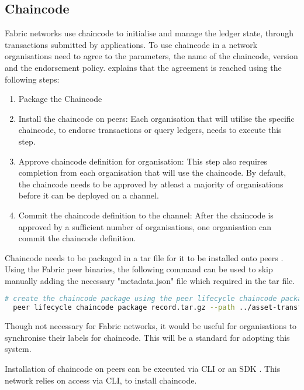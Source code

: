 \subsection{Chaincode}
Fabric networks use chaincode to initialise and manage the ledger state, through transactions submitted by applications. \cite{noauthor_writing_nodate}
To use chaincode in a network organisations need to agree to the parameters, the name of the chaincode, version and the endorsement policy. 
\cite{noauthor_writing_nodate} explains that the agreement is reached using the following steps:
\begin{enumerate}
  \item Package the Chaincode
  \item Install the chaincode on peers: Each organisation that will utilise the specific chaincode, to endorse transactions or query ledgers, needs to execute this step.
  \item Approve chaincode definition for organisation: This step also requires completion from each organisation that will use the chaincode. By default, the chaincode needs to be approved by atleast a majority of organisations before it can be deployed on a channel.
  \item Commit the chaincode definition to the channel: After the chaincode is approved by a sufficient number of organisations, one organisation can commit the chaincode definition.
\end{enumerate}

Chaincode needs to be packaged in a tar file for it to be installed onto peers \cite{noauthor_fabric_nodate}. Using the Fabric peer binaries, the following command can be used to skip manually adding the necessary "metadata.json" file which required in the tar file.
\begin{lstlisting}[language=bash, caption={peer lifecycle chaincode package command}]
  # create the chaincode package using the peer lifecycle chaincode package command
  peer lifecycle chaincode package record.tar.gz --path ../asset-transfer-basic/chaincode-go/ --lang golang --label record_1.0
\end{lstlisting}

Though not necessary for Fabric networks, it would be useful for organisations to synchronise their labels for chaincode. 
This will be a standard for adopting this system.

Installation of chaincode on peers can be executed via CLI or an SDK \cite{noauthor_fabric_nodate}. 
This network relies on access via CLI, to install chaincode. 



